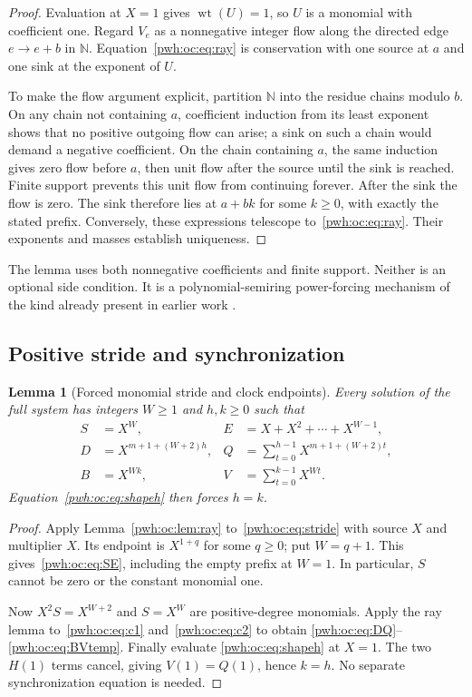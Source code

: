 \documentclass[11pt,letterpaper]{article}
\numberwithin{equation}{section}
\newtheorem{lemma}[theorem]{Lemma}
\theoremstyle{definition}
\newcommand{\N}{\mathbb N}
\newcommand{\wt}{\operatorname{wt}}
\begin{document}
\begin{proof}
Evaluation at $X=1$ gives $\wt(U)=1$, so $U$ is a monomial with coefficient
one. Regard $V_e$ as a nonnegative integer flow along the directed edge
$e\to e+b$ in $\N$. Equation~\eqref{pwh:oc:eq:ray} is conservation with one
source at $a$ and one sink at the exponent of $U$.

To make the flow argument explicit, partition $\N$ into the residue
chains modulo $b$. On any chain not containing $a$, coefficient induction
from its least exponent shows that no positive outgoing flow can arise;
a sink on such a chain would demand a negative coefficient. On the chain
containing $a$, the same induction gives zero flow before $a$, then unit
flow after the source until the sink is reached. Finite support prevents
this unit flow from continuing forever. After the sink the flow is zero.
The sink therefore lies at $a+bk$ for some $k\ge0$, with exactly the
stated prefix. Conversely, these expressions telescope to~\eqref{pwh:oc:eq:ray}.
Their exponents and masses establish uniqueness.
\end{proof}

The lemma uses both nonnegative coefficients and finite support. Neither
is an optional side condition. It is a polynomial-semiring power-forcing
mechanism of the kind already present in earlier work \cite{oc:Narendran}.

\subsection{Positive stride and synchronization}

\begin{lemma}[Forced monomial stride and clock endpoints]
\label{pwh:oc:lem:clocks}
Every solution of the full system has integers $W\ge1$ and $h,k\ge0$
such that
\begin{align}
 S&=X^W,& E&=X+X^2+\cdots+X^{W-1},\label{pwh:oc:eq:SE}\\
 D&=X^{m+1+(W+2)h},&
 Q&=\sum_{t=0}^{h-1}X^{m+1+(W+2)t},\label{pwh:oc:eq:DQ}\\
 B&=X^{Wk},& V&=\sum_{t=0}^{k-1}X^{Wt}.\label{pwh:oc:eq:BVtemp}
\end{align}
Equation~\eqref{pwh:oc:eq:shapeh} then forces $h=k$.
\end{lemma}

\begin{proof}
Apply Lemma~\ref{pwh:oc:lem:ray} to~\eqref{pwh:oc:eq:stride} with source $X$ and
multiplier $X$. Its endpoint is $X^{1+q}$ for some $q\ge0$; put
$W=q+1$. This gives~\eqref{pwh:oc:eq:SE}, including the empty prefix at $W=1$.
In particular, $S$ cannot be zero or the constant monomial one.

Now $X^2S=X^{W+2}$ and $S=X^W$ are positive-degree monomials. Apply
the ray lemma to~\eqref{pwh:oc:eq:c1} and~\eqref{pwh:oc:eq:c2} to obtain
\eqref{pwh:oc:eq:DQ}--\eqref{pwh:oc:eq:BVtemp}. Finally evaluate
\eqref{pwh:oc:eq:shapeh} at $X=1$. The two $H(1)$ terms cancel, giving
$V(1)=Q(1)$, hence $k=h$. No separate synchronization equation is needed.
\end{proof}
\end{document}
